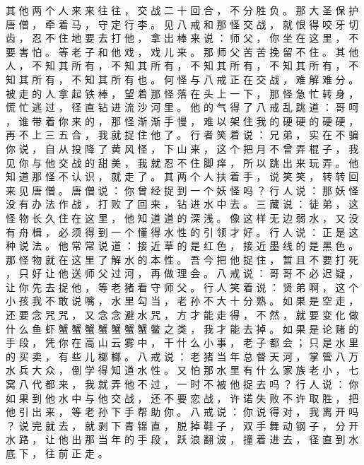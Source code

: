 {其 他 两 个 人 来 来 往 往 ， 交 战 二 十 回 合 ， 不 分 胜 负 。
那 大 圣 保 护 唐 僧 ， 牵 着 马 ， 守 定 行 李 。
见 八 戒 和 那 怪 交 战 ， 就 恨 得 咬 牙 切 齿 ， 忍 不 住 地 要 去 打 他 ， 拿 出 棒 来 说 ： 师 父 ， 你 坐 在 这 里 ， 不 要 害 怕 。
等 老 子 和 他 戏 ， 戏 儿 来 。
那 师 父 苦 苦 挽 留 不 住 。
其 他 人 ， 不 知 其 所 有 ， 不 知 其 所 有 ， 不 知 其 所 有 ， 不 知 其 所 有 ， 不 知 其 所 有 ， 不 知 其 所 有 也 。
何 怪 与 八 戒 正 在 交 战 ， 难 解 难 分 。
被 走 的 人 拿 起 铁 棒 ， 望 着 那 怪 落 在 头 上 一 下 ， 那 怪 急 忙 转 身 ， 慌 忙 逃 过 ， 径 直 钻 进 流 沙 河 里 。
他 的 气 得 了 八 戒 乱 跳 道 ： 哥 呵 ， 谁 带 着 你 来 的 ， 那 怪 渐 渐 手 慢 ， 难 以 架 住 我 的 硬 硬 的 硬 硬 ， 再 不 上 三 五 合 ， 我 就 捉 住 他 了 。
行 者 笑 着 说 ： 兄 弟 ， 实 在 不 骗 你 说 ， 自 从 投 降 了 黄 风 怪 ， 下 山 来 ， 这 个 把 月 不 曾 弄 棍 子 ， 我 见 你 与 他 交 战 的 甜 美 ， 我 就 忍 不 住 脚 痒 ， 所 以 跳 出 来 玩 弄 。
他 知 道 那 怪 不 认 识 ， 就 走 了 。
其 两 个 人 扶 着 手 ， 说 笑 笑 ， 转 转 回 来 见 唐 僧 。
唐 僧 说 ： 你 曾 经 捉 到 一 个 妖 怪 吗 ？ 行 人 说 ： 那 妖 怪 没 有 办 法 作 战 ， 打 败 了 回 来 ， 钻 进 水 中 去 。
三 藏 说 ： 徒 弟 ， 这 怪 物 长 久 住 在 这 里 ， 他 知 道 道 的 深 浅 。
像 这 样 无 边 弱 水 ， 又 没 有 舟 楫 ， 必 须 得 到 一 个 懂 得 水 性 的 引 领 才 好 。
行 人 说 ： 正 是 这 种 说 法 。
他 常 常 说 道 ： 接 近 草 的 是 红 色 ， 接 近 墨 线 的 是 黑 色 。
那 怪 物 就 在 这 里 了 解 水 的 本 性 。
吾 今 把 他 捉 住 ， 暂 且 不 要 打 死 ， 只 好 让 他 送 师 父 过 河 ， 再 做 理 会 。
八 戒 说 ： 哥 哥 不 必 迟 疑 ， 让 你 先 去 捉 他 ， 等 老 猪 看 守 师 父 。
行 人 笑 着 说 ： 贤 弟 啊 ， 这 个 小 孩 我 不 敢 说 嘴 ， 水 里 勾 当 ， 老 孙 不 大 十 分 熟 。
如 果 是 空 走 ， 还 要 念 咒 咒 ， 又 念 念 避 水 咒 ， 方 才 能 走 得 ， 不 然 ， 就 要 变 化 做 什 么 鱼 虾 蟹 蟹 蟹 蟹 蟹 蟹 蟹 鳖 之 类 ， 我 才 能 去 掉 。
如 果 是 论 赌 的 手 段 ， 凭 你 在 高 山 云 雾 中 ， 干 什 么 小 事 ， 老 子 都 会 ； 只 是 水 里 的 买 卖 ， 有 些 儿 榔 榔 。
八 戒 说 ： 老 猪 当 年 总 督 天 河 ， 掌 管 八 万 水 兵 大 众 ， 倒 学 得 知 道 水 性 。
又 怕 那 水 里 有 什 么 家 族 老 小 ， 七 窝 八 代 都 来 ， 我 就 弄 他 不 过 ， 一 时 不 被 他 捉 去 吗 ？ 行 人 说 ： 你 如 果 到 他 水 中 与 他 交 战 ， 还 不 要 恋 战 ， 许 诺 失 败 不 许 取 胜 ， 把 他 引 出 来 ， 等 老 孙 下 手 帮 助 你 。
八 戒 说 ： 你 说 得 对 ， 我 离 开 吗 ？
说 完 就 去 ， 就 剥 下 青 锦 直 ， 脱 掉 鞋 子 ， 双 手 舞 动 钢 子 ， 分 开 水 路 ， 让 他 出 那 当 年 的 手 段 ， 跃 浪 翻 波 ， 撞 着 进 去 ， 径 直 到 水 底 下 ， 往 前 正 走 。
}
